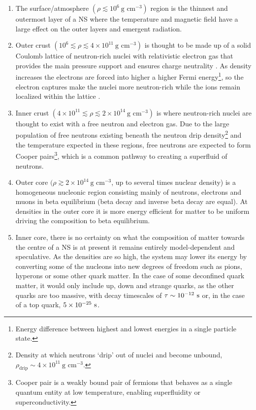 \begin{enumerate}
    \item The surface/atmosphere  $(\rho \lesssim 10^6 \ \text{g cm}^{-3})$ region is the thinnest and outermost layer of a NS where the temperature and magnetic field have a large effect on the outer layers and emergent radiation. 
    
    \item Outer crust $(10^6 \lesssim \rho \lesssim 4 \times 10^{11} \ \text{g cm}^{-3})$ is thought to be made up of a solid Coulomb lattice of neutron-rich nuclei with relativistic electron gas that provides the main pressure support and ensures charge neutrality \cite{koliogiannis_outer-crust_2026}. As density increases the electrons are forced into higher a higher Fermi energy\footnote{Energy difference between highest and lowest energies in a single particle state.}, so the electron captures make the nuclei more neutron-rich while the ions remain localized within the lattice \citep{burgio_neutron_2021}. 

    \item Inner crust $(4 \times 10^{11} \lesssim \rho \lesssim 2 \times 10^{14} \ \text{g cm}^{-3})$ is where neutron-rich nuclei are thought to exist with a free neutron and electron gas. Due to the large population of free neutrons existing beneath the neutron drip density\footnote{Density at which neutrons `drip' out of nuclei and become unbound, $\rho_{\text{drip}} \sim 4 \times 10^{11}~\text{g cm}^{-3}$.} and the temperature expected in these regions, free neutrons are expected to form Cooper pairs\footnote{Cooper pair is a weakly bound pair of fermions that behaves as a single quantum entity at low temperature, enabling superfluidity or superconductivity.}, which is a common pathway to creating a superfluid of neutrons.   

    \item Outer core $(\rho \gtrsim 2 \times 10^{14} \ \text{g cm}^{-3}$, up to several times nuclear density) is a homogeneous nucleonic region consisting mainly of neutrons, electrons and muons in beta equilibrium (beta decay and inverse beta decay are equal).  At densities in the outer core it is more energy efficient for matter to be uniform driving the composition to beta equilibrium. 

    \item Inner core, there is no certainty on what the composition of matter towards the centre of a NS is at present it remains entirely model-dependent and speculative. As the densities are so high, the system may lower its energy by converting some of the nucleons into new degrees of freedom such as pions, hyperons or some other quark matter. In the case of some deconfined quark matter, it would only include up, down and strange quarks, as the other quarks are too massive, with decay timescales of $\tau \sim 10^{-12}~\rm s$ or, in the case of a top quark, $5\times10^{-25}~\rm s$.

    
\end{enumerate}

